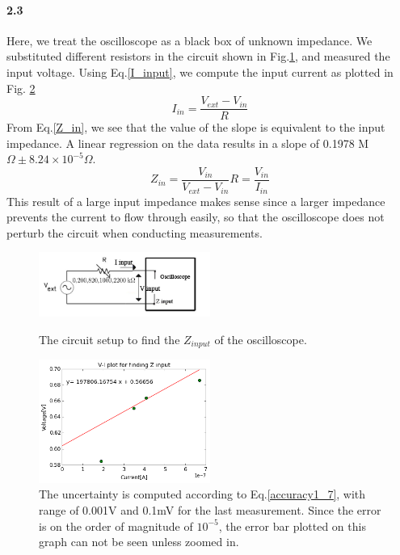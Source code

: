 \documentclass[authoryear, 12pt,5p, times]{elsarticle}
\begin{document}
\paragraph{\textbf{2.3}}
Here, we treat the oscilloscope as a black box of unknown impedance.  We substituted different resistors in the circuit shown in  Fig.\ref{Z_input}, and measured the input voltage. Using Eq.\ref{I_input}, we compute the input current as plotted in Fig. \ref{Z_input_plots}
\begin{equation}
I_{in} =\frac{V_{ext}-V_{in}}{R}
\label{I_input}
\end{equation}
From Eq.\ref{Z_in}, we see that the value of the slope is equivalent to the input impedance. A linear regression on the data results in a slope of 0.1978 M$\Omega\pm 8.24\times10^{-5}\Omega$. 
\begin{equation}
Z_{in}=\frac{V_{in}}{V_{ext}-V_{in}}R =\frac{V_{in}}{I_{in}}
\label{Z_in}
\end{equation}This result of a large input impedance makes sense since a larger impedance prevents the current to flow through easily, so that the oscilloscope does not perturb the circuit when conducting measurements.
\begin{figure}[h!]
\includegraphics[width=0.5\textwidth]{figure/Z_input}
\label{Z_input}
\caption{The circuit setup to find the $Z_{input}$ of the oscilloscope.}
\end{figure}
\begin{figure}[h!]
\includegraphics[width=0.5\textwidth]{figure/Z_input_plot}
\caption{The uncertainty is computed according to Eq.\ref{accuracy1_7}, with range of 0.001V and 0.1mV for the last measurement. Since the error is on the order of magnitude of $10^{-5}$, the error bar plotted on this graph can not be seen unless zoomed in. }
\label{Z_input_plots}
\end{figure}
\end{document}
